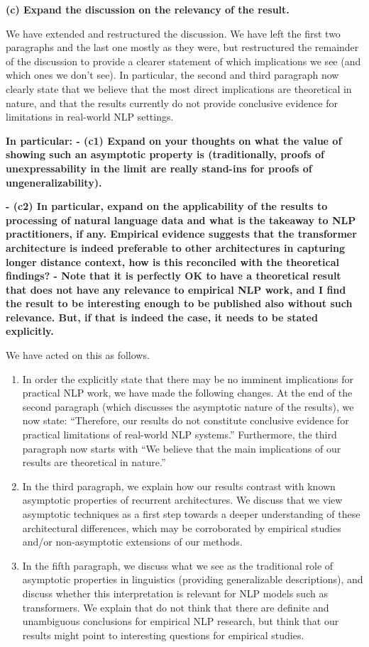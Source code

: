 \documentclass[11pt,a4paper]{article}
\newcommand\response[1]{{\color{blue}#1}}
\newcommand\original[1]{\textbf{#1}}
\begin{document}
\original{(c) Expand the discussion on the relevancy of the result.}

\response{We have extended and restructured the discussion. We have left the first two paragraphs and the last one mostly as they were, but restructured the remainder of the discussion to provide a clearer statement of which implications we see (and which ones we don't see). In particular, the second and third paragraph now clearly state that we believe that the most direct implications are theoretical in nature, and that the results currently do not provide conclusive evidence for limitations in real-world NLP settings.}

\original{In particular:
- (c1) Expand on your thoughts on what the value of showing such an
asymptotic property is (traditionally, proofs of unexpressability in the
limit are really stand-ins for proofs of ungeneralizability).}

\original{- (c2) In particular, expand on the applicability of the results to
processing of natural language data and what is the takeaway to NLP
practitioners, if any. Empirical evidence suggests that the transformer
architecture is indeed preferable to other architectures in capturing longer
distance context, how is this reconciled with the theoretical findings?
- Note that it is perfectly OK to have a theoretical result that does not
have any relevance to empirical NLP work, and I find the result to be
interesting enough to be published also without such relevance. But, if that
is indeed the case, it needs to be stated explicitly.}

\response{We have acted on this as follows.}
\begin{enumerate}
    \item \response{In order the explicitly state that there may be no imminent implications for practical NLP work, we have made the following changes. At the end of the second paragraph (which discusses the asymptotic nature of the results), we now state: ``Therefore, our results do not constitute conclusive evidence for practical limitations of real-world NLP systems.'' Furthermore, the third paragraph now starts with ``We  believe  that  the  main  implications  of  our results  are  theoretical  in  nature.''}

\item \response{In the third paragraph, we  explain how our results contrast with known asymptotic properties of recurrent architectures. We discuss that we view asymptotic techniques as a first step towards a deeper understanding of these architectural differences, which may be corroborated by empirical studies and/or non-asymptotic extensions of our methods.}

\item \response{In the fifth paragraph, we discuss what we see as the traditional role of asymptotic properties in linguistics (providing generalizable descriptions), and discuss whether this interpretation is relevant for NLP models such as transformers. We explain that do not think that there are definite and unambiguous conclusions for empirical NLP research, but think that our results might point to interesting questions for empirical studies. }
\end{enumerate}
\end{document}
